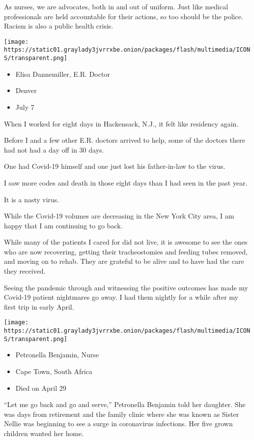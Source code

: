 As nurses, we are advocates, both in and out of uniform. Just like
medical professionals are held accountable for their actions, so too
should be the police. Racism is also a public health crisis.

\texttt{[image: https://static01.graylady3jvrrxbe.onion/packages/flash/multimedia/ICONS/transparent.png]}

\begin{itemize}
\tightlist
\item
  Elisa Dannemiller, E.R. Doctor
\item
  Denver
\item
  July 7
\end{itemize}

When I worked for eight days in Hackensack, N.J., it felt like residency
again.

Before I and a few other E.R. doctors arrived to help, some of the
doctors there had not had a day off in 30 days.

One had Covid-19 himself and one just lost his father-in-law to the
virus.

I saw more codes and death in those eight days than I had seen in the
past year.

It is a nasty virus.

While the Covid-19 volumes are decreasing in the New York City area, I
am happy that I am continuing to go back.

While many of the patients I cared for did not live, it is awesome to
see the ones who are now recovering, getting their tracheostomies and
feeding tubes removed, and moving on to rehab. They are grateful to be
alive and to have had the care they received.

Seeing the pandemic through and witnessing the positive outcomes has
made my Covid-19 patient nightmares go away. I had them nightly for a
while after my first trip in early April.

\texttt{[image: https://static01.graylady3jvrrxbe.onion/packages/flash/multimedia/ICONS/transparent.png]}

\begin{itemize}
\tightlist
\item
  Petronella Benjamin, Nurse
\item
  Cape Town, South Africa
\item
  Died on April 29
\end{itemize}

``Let me go back and go and serve,'' Petronella Benjamin told her
daughter. She was days from retirement and the family clinic where she
was known as Sister Nellie was beginning to see a surge in coronavirus
infections. Her five grown children wanted her home.

